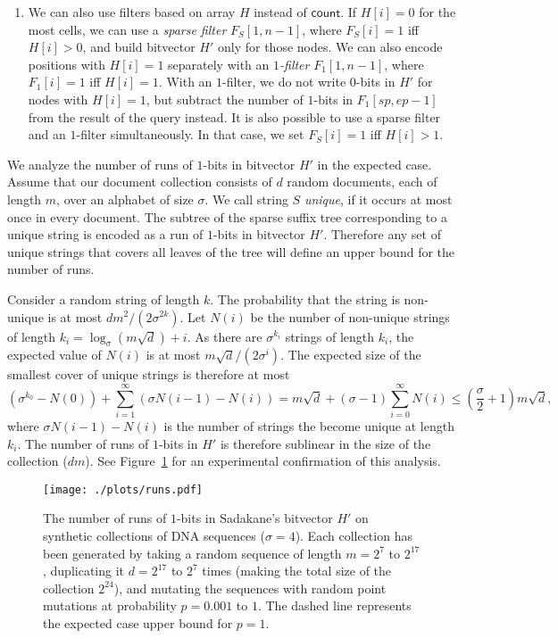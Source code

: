 \documentclass[11pt]{llncs}
\newcommand{\mcount}{\ensuremath{\mathsf{count}}}
\newcommand{\onebit}{$1$\nobreakdash-bit}
\newcommand{\zerobit}{$0$\nobreakdash-bit}
\begin{document}
\begin{enumerate}
\item We can also use filters based on array $H$ instead of $\mcount$. If $H[i] = 0$ for the most cells, we can use a \emph{sparse filter} $F_{S}[1,n-1]$, where $F_{S}[i] = 1$ iff $H[i] > 0$, and build bitvector $H'$ only for those nodes. We can also encode positions with $H[i] = 1$ separately with an \emph{$1$\nobreakdash-filter} $F_{1}[1,n-1]$, where $F_{1}[i] = 1$ iff $H[i] = 1$. With an $1$\nobreakdash-filter, we do not write \zerobit{}s in $H'$ for nodes with $H[i] = 1$, but subtract the number of \onebit{}s in $F_{1}[sp,ep-1]$ from the result of the query instead. It is also possible to use a sparse filter and an $1$\nobreakdash-filter simultaneously. In that case, we set $F_{S}[i] = 1$ iff $H[i] > 1$.

\end{enumerate}

We analyze the number of runs of \onebit{}s in bitvector $H'$ in the expected
case. Assume that our document collection consists of $d$ random documents,
each of length $m$, over an alphabet of size $\sigma$. We call string $S$ \emph{unique},
if it occurs at most once in every document. The subtree of the sparse suffix tree
corresponding to a unique string is encoded as a run of \onebit{}s in
bitvector $H'$. Therefore any set of unique strings that covers all leaves of the tree
will define an upper bound for the number of runs.

Consider a random string of length $k$. The probability that the string is non-unique is
at most $dm^{2} / (2\sigma^{2k})$. Let $N(i)$ be the number of non-unique strings of length
$k_{i} = \log_{\sigma} (m \sqrt{d}) + i$. As there are $\sigma^{k_{i}}$ strings of length
$k_{i}$, the expected value of $N(i)$ is at most $m \sqrt{d} / (2 \sigma^{i})$. The expected
size of the smallest cover of unique strings is therefore at most
\begin{displaymath}
(\sigma^{k_{0}} - N(0)) + \sum_{i=1}^{\infty} (\sigma N(i-1) - N(i)) =
m \sqrt{d} + (\sigma - 1) \sum_{i=0}^{\infty} N(i) \le
\left( \frac{\sigma}{2} + 1 \right) m \sqrt{d},
\end{displaymath}
where $\sigma N(i-1) - N(i)$ is the number of strings the become unique at length $k_{i}$.
The number of runs of \onebit{}s in $H'$ is therefore sublinear in the size of the
collection ($dm$). See Figure~\ref{figure:runs} for an experimental confirmation of this analysis.

\begin{figure}[t]
\texttt{[image: ./plots/runs.pdf]}

\caption{The number of runs of $1$-bits in Sadakane's bitvector $H'$ on synthetic collections of DNA sequences ($\sigma = 4$). Each collection has been generated by taking a random sequence of length $m = 2^{7}$ to $2^{17}$, duplicating it $d = 2^{17}$ to $2^{7}$ times (making the total size of the collection $2^{24}$), and mutating the sequences with random point mutations at probability $p = 0.001$ to $1$. The dashed line represents the expected case upper bound for $p = 1$.}\label{figure:runs}
\end{figure}
\end{document}
